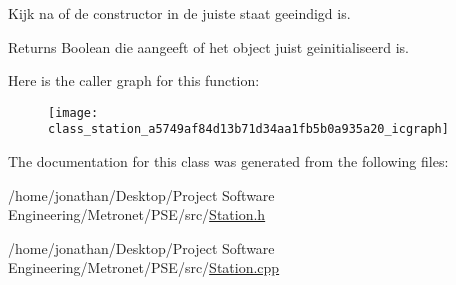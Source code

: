 Kijk na of de constructor in de juiste staat geeindigd is. 

\begin{DoxyReturn}{Returns}
Boolean die aangeeft of het object juist geinitialiseerd is. 
\end{DoxyReturn}


Here is the caller graph for this function\+:\nopagebreak
\begin{figure}[H]
\begin{center}
\leavevmode
\texttt{[image: class\_station\_a5749af84d13b71d34aa1fb5b0a935a20\_icgraph]}
\end{center}
\end{figure}




The documentation for this class was generated from the following files\+:\begin{DoxyCompactItemize}
\item 
/home/jonathan/\+Desktop/\+Project Software Engineering/\+Metronet/\+P\+S\+E/src/\hyperlink{_station_8h}{Station.\+h}\item 
/home/jonathan/\+Desktop/\+Project Software Engineering/\+Metronet/\+P\+S\+E/src/\hyperlink{_station_8cpp}{Station.\+cpp}\end{DoxyCompactItemize}
